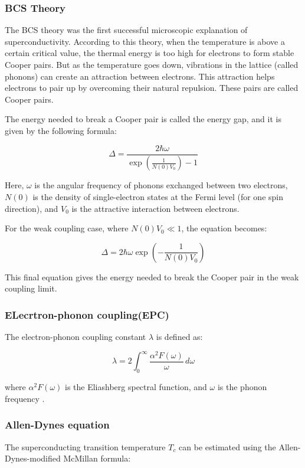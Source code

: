 \documentclass[12pt,a4paper]{article}
\begin{document}
\subsubsection{BCS Theory}


The BCS theory was the first successful microscopic explanation of superconductivity. According to this theory, when the temperature is above a certain critical value, the thermal energy is too high for electrons to form stable Cooper pairs. But as the temperature goes down, vibrations in the lattice (called phonons) can create an attraction between electrons. This attraction helps electrons to pair up by overcoming their natural repulsion. These pairs are called Cooper pairs\cite{bcs1957}.

The energy needed to break a Cooper pair is called the energy gap, and it is given by the following formula:

\[
\Delta = \frac{2\hbar \omega}{\exp\left(\frac{1}{N(0)V_0}\right) - 1}
\]

Here, \( \omega \) is the angular frequency of phonons exchanged between two electrons, \( N(0) \) is the density of single-electron states at the Fermi level (for one spin direction), and \( V_0 \) is the attractive interaction between electrons.

For the weak coupling case, where \( N(0)V_0 \ll 1 \), the equation becomes:

\[
\Delta = 2\hbar \omega \exp\left(-\frac{1}{N(0)V_0}\right)
\]

This final equation gives the energy needed to break the Cooper pair in the weak coupling limit.
\subsubsection{ELecrtron-phonon coupling(EPC)}


The electron-phonon coupling constant \( \lambda \) is defined as:

\[
\lambda = 2 \int_0^{\infty} \frac{\alpha^2F(\omega)}{\omega} \, d\omega
\]

where \( \alpha^2F(\omega) \) is the Eliashberg spectral function, and \( \omega \) is the phonon frequency \cite{grimvall1981}.

\subsubsection{Allen-Dynes equation}



The superconducting transition temperature \( T_c \) can be estimated using the Allen-Dynes-modified McMillan formula:
\end{document}
